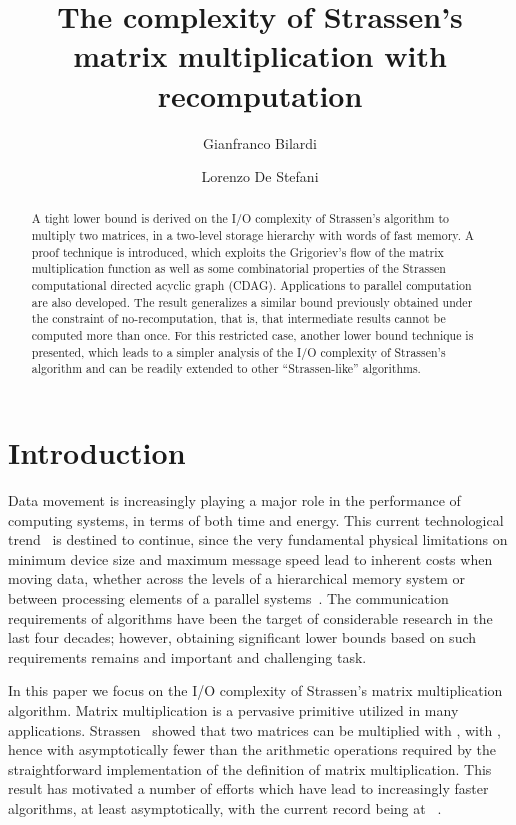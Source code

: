 \documentclass[a4paper,UKenglish]{lipics-v2016}
\title{The \io complexity of Strassen's matrix multiplication
  with recomputation}
\author[1]{Gianfranco Bilardi}
\author[2]{Lorenzo De Stefani}
\affil[1]{Department of Information Engineering, University of Padova, Via Gradenigo 6B/Padova, Italy\\
  \texttt{bilardi@dei.unipd.it}}
\affil[2]{Department of Computer Science, Brown University, 115 Waterman Street/Providence, United States of America\\
  \texttt{lorenzo@cs.brown.edu}}
\newcommand{\io }{I/O }
\begin{document}
\maketitle

\begin{abstract}
A tight  lower bound is derived on
the \io complexity of Strassen's algorithm to multiply two  matrices, in a two-level storage hierarchy with  words of fast
memory.  A proof technique is introduced, which exploits the Grigoriev's
flow of the matrix multiplication function as well as some
combinatorial properties of the Strassen computational directed acyclic graph (CDAG).
Applications to parallel computation are also developed. The result
generalizes a similar bound previously obtained under the constraint
of no-recomputation, that is, that intermediate results cannot be
computed more than once. For this restricted case, another lower bound
technique is presented, which leads to a simpler analysis of the \io
complexity of Strassen's algorithm and can be readily extended to
other ``Strassen-like'' algorithms.
 \end{abstract}

\section{Introduction}
Data movement is increasingly playing a major role in the performance
of computing systems, in terms of both time and energy. This current
technological trend~\cite{patterson2005getting} is destined to
continue, since the very fundamental physical limitations on minimum
device size and maximum message speed lead to inherent costs when
moving data, whether across the levels of a hierarchical memory system
or between processing elements of a parallel
systems~\cite{bilardi1995horizons}. The communication requirements of
algorithms have been the target of considerable research in the last
four decades; however, obtaining significant lower bounds based on such
requirements remains and important and challenging task.

In this paper we focus on the \io complexity of Strassen's matrix
multiplication algorithm.  Matrix multiplication is a pervasive
primitive utilized in many applications.
Strassen~\cite{strassen1969gaussian} showed that two 
matrices can be multiplied with , with , hence with asymptotically fewer than the 
arithmetic operations required by the straightforward implementation
of the definition of matrix multiplication. This result has motivated
a number of efforts which have lead to increasingly faster algorithms,
at least asymptotically, with the current record being at ~\cite{legall2014}.
\end{document}

